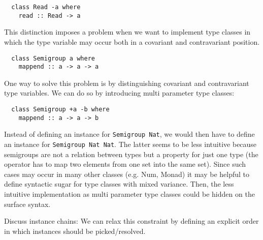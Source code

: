 \begin{verbatim}
  class Read -a where
    read :: Read -> a
\end{verbatim}

This distinction imposes a problem when we want to implement type classes in which the type variable may occur both in a covariant and contravariant position.

\begin{verbatim}
  class Semigroup a where
    mappend :: a -> a -> a
\end{verbatim}

One way to solve this problem is by distinguishing covariant and contravariant type variables.
We can do so by introducing multi parameter type classes:

\begin{verbatim}
  class Semigroup +a -b where
    mappend :: a -> a -> b
\end{verbatim}

Instead of defining an instance for \texttt{Semigroup Nat}, we would then have to define an instance for \texttt{Semigroup Nat Nat}.
The latter seems to be less intuitive because semigroups are not a relation between types but a property for just one type (the operator has to map two elements from one set into the same set).
Since such cases may occur in many other classes (e.g. Num, Monad) it may be helpful to define syntactic sugar for type classes with mixed variance.
Then, the less intuitive implementation as multi parameter type classes could be hidden on the surface syntax.

  Discuss instance chains:
  We can relax this constraint by defining an explicit order in which instances should be picked/resolved.
  \cite{morris2010instance}